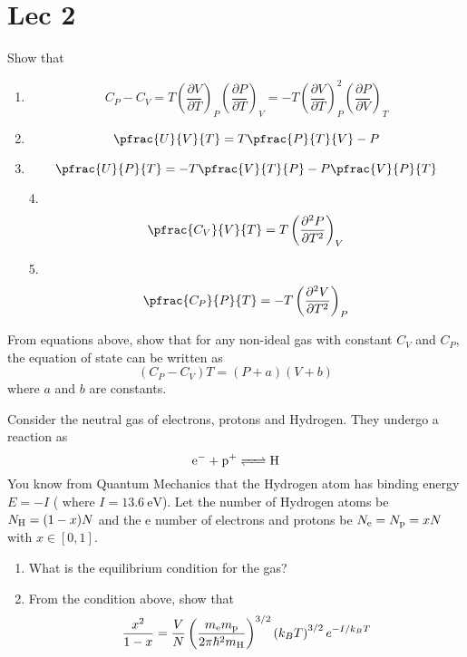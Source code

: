 \documentclass[CJK]{beamer}
\begin{document}
\section{Lec 2}
\begin{frame}
\bch
Show that
\begin{enumerate}
\item $$C_P - C_V = T \left(\frac{\partial V}{\partial T}\right)_P \left(\frac{\partial P}{\partial T}\right)_V = - T \left( \frac{\partial V}{\partial T}\right)_P^2 \left( \frac{\partial P}{\partial V}\right)_T$$
\item $$\pfrac{U}{V}{T} = T \pfrac{P}{T}{V} - P$$
\item $$\pfrac{U}{P}{T} = -T \pfrac{V}{T}{P} - P \pfrac{V}{P}{T}$$
\end{enumerate}
\ech
\end{frame}


\begin{frame}
\bch
\begin{enumerate}
\item[4.] $$\pfrac{C_V}{V}{T} = T \left( \frac{\partial^2 P}{\partial T^2} \right)_V$$
\item[5.] $$\pfrac{C_P}{P}{T} = -T \left( \frac{\partial^2 V}{\partial T^2} \right)_P$$
\end{enumerate}
From equations above, show that for any non-ideal gas with constant $C_V$ and $C_P$, the equation of state can be written as $$ (C_P - C_V) T = (P+a)(V+b)$$ where $a$ and $b$ are constants.
\ech
\end{frame}

\begin{frame}
\bch
Consider the neutral gas of electrons, protons and Hydrogen. They undergo a reaction as $$ \ce{e- + p+ <=> H}$$ You know from Quantum Mechanics that the Hydrogen atom
has binding energy $E = -I$ ( where $I = 13.6 \mathrm{\ eV}$). Let the number of Hydrogen atoms
be $N_{\rm H} = (1-x) N$ and the e number of electrons and protons be $N_{\rm e} = N_{\rm p} = xN$ with $x\in [0,1]$.
\begin{enumerate}
\item What is the equilibrium condition for the gas?
\item From the condition above, show that $$\frac{x^{2}}{1-x}=\frac{V}{N}\left(\frac{m_{\rm e} m_{\rm p}}{2 \pi \hbar^{2} m_{\rm H}}\right)^{3 / 2}\left(k_{B} T\right)^{3 / 2} e^{-I / k_{B} T}$$
\end{enumerate}
\ech
\end{frame}
\end{document}
